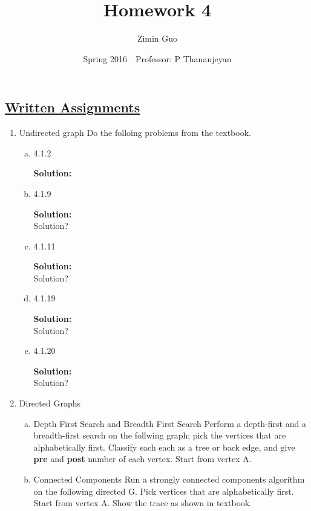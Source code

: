 \documentclass{article}\usepackage{amsmath,amssymb,amsthm,tikz,tkz-graph,color,chngpage,soul,hyperref,csquotes,graphicx,floatrow}\newcommand*{\QEDB}{\hfill\ensuremath{\square}}\newtheorem*{prop}{Proposition}\renewcommand{\theenumi}{\alph{enumi}}\usepackage[shortlabels]{enumitem}\usepackage[nobreak=true]{mdframed}\usetikzlibrary{matrix,calc}\MakeOuterQuote{"}\usepackage[margin=0.75in]{geometry} \newtheorem{theorem}{Theorem}
\title{Homework 4}
\author{Zimin Guo }
\date{Spring 2016$\quad$Professor: P Thananjeyan}
\begin{document}
\maketitle


\subsection*{\underline{Written Assignments}}
\begin{enumerate}[1.]
\item Undirected graph
Do the folloing problems from the textbook.
\begin{enumerate}[a)]
\item 4.1.2
\begin{mdframed}
\textbf{Solution:} 
\end{mdframed}

\item 4.1.9
\begin{mdframed}
\textbf{Solution:} \\
Solution?
\end{mdframed}

\item 4.1.11
\begin{mdframed}
\textbf{Solution:} \\
Solution?
\end{mdframed}

\item 4.1.19
\begin{mdframed}
\textbf{Solution:} \\
Solution?
\end{mdframed}


\item 4.1.20 
\begin{mdframed}
\textbf{Solution:} \\
Solution?
\end{mdframed}

\end{enumerate}



\item Directed Graphs
\begin{enumerate}[a)]
\item Depth First Search and Breadth First Search
Perform a depth-first and a breadth-first search on the follwing graph; pick the vertices that are alphabetically first. Classify each each as a tree or back edge, and give \textbf{pre} and \textbf{post} number of each vertex. Start from vertex A. %
\item Connected Components
Run a strongly connected components algorithm on the following directed G. Pick vertices that are alphabetically first. Start from vertex A. Show the trace as shown in textbook. %
\end{enumerate}


\end{enumerate}
\end{document}

